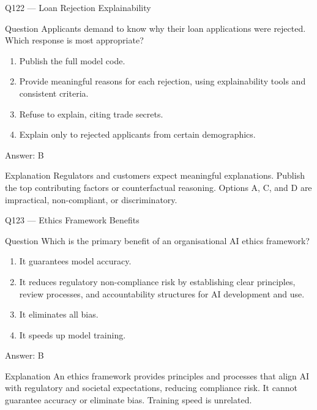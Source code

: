\documentclass[aspectratio=169,8pt]{beamer}
\begin{document}
\begin{frame}{Q122 --- Loan Rejection Explainability}
	
	\begin{block}{Question}
		Applicants demand to know why their loan applications were rejected. Which response is most appropriate?
		
		\begin{enumerate}
			\item Publish the full model code.
			\item Provide meaningful reasons for each rejection, using explainability tools and consistent criteria.
			\item Refuse to explain, citing trade secrets.
			\item Explain only to rejected applicants from certain demographics.
		\end{enumerate}
	\end{block}
	
	\begin{exampleblock}{Answer: B}
	\end{exampleblock}
	
	\begin{block}{Explanation}
		Regulators and customers expect meaningful explanations. Publish the top contributing factors or counterfactual reasoning. Options A, C, and D are impractical, non-compliant, or discriminatory.
	\end{block}
	
\end{frame}



\begin{frame}{Q123 --- Ethics Framework Benefits}
	
	\begin{block}{Question}
		Which is the primary benefit of an organisational AI ethics framework?
		
		\begin{enumerate}
			\item It guarantees model accuracy.
			\item It reduces regulatory non-compliance risk by establishing clear principles, review processes, and accountability structures for AI development and use.
			\item It eliminates all bias.
			\item It speeds up model training.
		\end{enumerate}
	\end{block}
	
	\begin{exampleblock}{Answer: B}
	\end{exampleblock}
	
	\begin{block}{Explanation}
		An ethics framework provides principles and processes that align AI with regulatory and societal expectations, reducing compliance risk. It cannot guarantee accuracy or eliminate bias. Training speed is unrelated.
	\end{block}
	
\end{frame}
\end{document}
